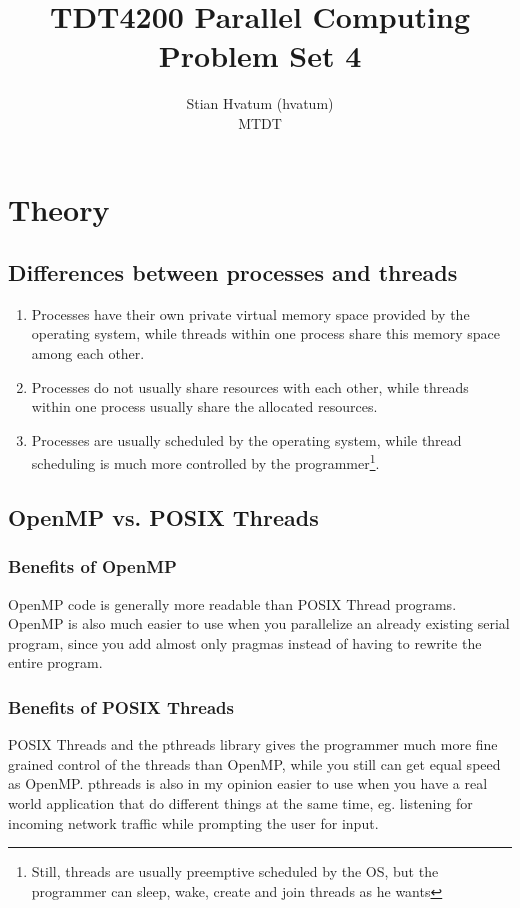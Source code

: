 \documentclass[english,a4paper,numbers=noenddot]{article}
\title{TDT4200 Parallel Computing\\
\Huge Problem Set 4}
\author{Stian Hvatum (hvatum)\\MTDT}
\begin{document}
\maketitle
\tableofcontents
\newpage
\section{Theory}
\subsection{Differences between processes and threads}
\begin{enumerate}
    \item Processes have their own private virtual memory space provided by the operating system, while threads within one process share this memory space among each other.\hfill
    \item Processes do not usually share resources with each other, while threads within one process usually share the allocated resources.\hfill
    \item Processes are usually scheduled by the operating system, while thread scheduling is much more controlled by the programmer\footnote{Still, threads are usually preemptive scheduled by the OS, but the programmer can sleep, wake, create and join threads as he wants}.\hfill
\end{enumerate}

\subsection{OpenMP vs. POSIX Threads}
\subsubsection{Benefits of OpenMP}
OpenMP code is generally more readable than POSIX Thread programs. OpenMP is also much easier to use when you parallelize an already existing serial program, since you add almost only pragmas instead of having to rewrite the entire program.

\subsubsection{Benefits of POSIX Threads}
POSIX Threads and the pthreads library gives the programmer much more fine grained control of the threads than OpenMP, while you still can get equal speed as OpenMP. pthreads is also in my opinion easier to use when you have a real world application that do different things at the same time, eg. listening for incoming network traffic while prompting the user for input.
\end{document}
